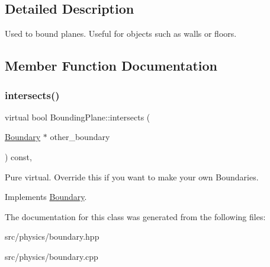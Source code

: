 \subsection{Detailed Description}
Used to bound planes. Useful for objects such as walls or floors. 

\subsection{Member Function Documentation}
\mbox{\label{class_bounding_plane_a3d956121121f32384cab3cab34544d6e}} 
\subsubsection{\texorpdfstring{intersects()}{intersects()}}
{\footnotesize\ttfamily virtual bool Bounding\+Plane\+::intersects (\begin{DoxyParamCaption}\item[{\mbox{\hyperlink{class_boundary}{Boundary}} $\ast$}]{other\+\_\+boundary }\end{DoxyParamCaption}) const\hspace{0.3cm}{\ttfamily [override]}, {\ttfamily [virtual]}}

Pure virtual. Override this if you want to make your own Boundaries. 

Implements \mbox{\hyperlink{class_boundary_a364909bdfa4a4945f974c34a39e198cc}{Boundary}}.



The documentation for this class was generated from the following files\+:\begin{DoxyCompactItemize}
\item 
src/physics/boundary.\+hpp\item 
src/physics/boundary.\+cpp\end{DoxyCompactItemize}
